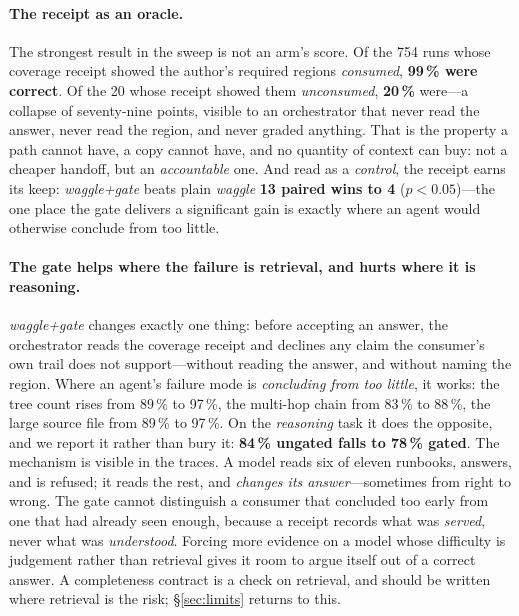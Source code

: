 \documentclass[10pt,twocolumn]{article}
\begin{document}
\paragraph{The receipt as an oracle.} The strongest result in the sweep is not an
arm's score. Of the 754 runs whose coverage receipt showed the author's required
regions \emph{consumed}, \textbf{99\,\% were correct}. Of the 20 whose receipt
showed them \emph{unconsumed}, \textbf{20\,\%} were---a collapse of seventy-nine
points, visible to an orchestrator that never read the answer, never read the
region, and never graded anything. That is the property a path cannot have, a
copy cannot have, and no quantity of context can buy: not a cheaper handoff, but
an \emph{accountable} one. And read as a \emph{control}, the receipt earns its
keep: \emph{waggle+gate} beats plain \emph{waggle} \textbf{13 paired wins to 4}
($p<0.05$)---the one place the gate delivers a significant gain is exactly where an
agent would otherwise conclude from too little.

\paragraph{The gate helps where the failure is retrieval, and hurts where it is
reasoning.} \emph{waggle+gate} changes exactly one thing: before accepting an
answer, the orchestrator reads the coverage receipt and declines any claim the
consumer's own trail does not support---without reading the answer, and without
naming the region. Where an agent's failure mode is \emph{concluding from too
little}, it works: the tree count rises from 89\,\% to 97\,\%, the multi-hop
chain from 83\,\% to 88\,\%, the large source file from 89\,\% to 97\,\%. On the
\emph{reasoning} task it does the opposite, and we report it rather than bury it:
\textbf{84\,\% ungated falls to 78\,\% gated}. The mechanism is visible in the
traces. A model reads six of eleven runbooks, answers, and is refused; it reads
the rest, and \emph{changes its answer}---sometimes from right to wrong. The gate
cannot distinguish a consumer that concluded too early from one that had already
seen enough, because a receipt records what was \emph{served}, never what was
\emph{understood}. Forcing more evidence on a model whose difficulty is judgement
rather than retrieval gives it room to argue itself out of a correct answer. A
completeness contract is a check on retrieval, and should be written where
retrieval is the risk; \S\ref{sec:limits} returns to this.
\end{document}
